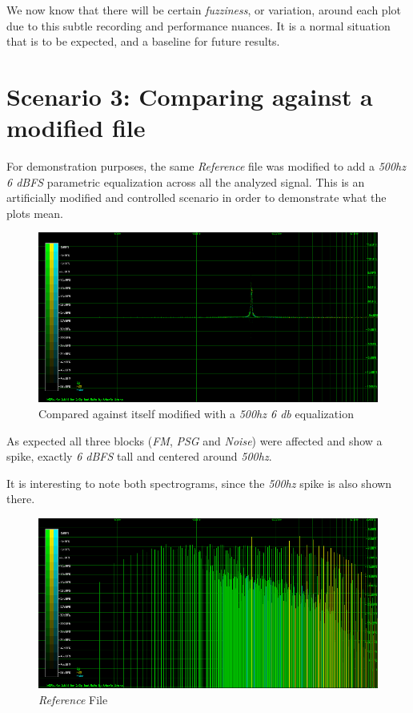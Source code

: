 \documentclass[10pt,a4paper]{report}
\begin{document}
We now know that there will be certain \textit{fuzziness}, or variation, around each plot due to this subtle recording and performance nuances. It is a normal situation that is to be expected, and a baseline for future results.

\section{Scenario 3: Comparing against a modified file}

For demonstration purposes, the same \textit{Reference} file was modified to add a \textit{500hz 6 dBFS} parametric equalization across all the analyzed signal. This is an artificially modified and controlled scenario in order to demonstrate what the plots mean.

\begin{figure}[H]
	\centering
	\includegraphics[width=1.0\linewidth]{images/interpretation/Plot3-Modified.png}
	\caption[1kHz modified]{Compared against itself modified with a \textit{500hz 6 db} equalization}
	\label{fig:plot3-modified}
\end{figure}

As expected all three blocks (\textit{FM}, \textit{PSG} and \textit{Noise}) were affected and show a spike, exactly \textit{6 dBFS} tall and centered around \textit{500hz}.

It is interesting to note both spectrograms, since the \textit{500hz} spike is also shown there.

\begin{figure}[H]
	\centering
	\includegraphics[width=1.0\linewidth]{images/interpretation/Plot3-Spectrogram.png}
	\caption[Reference File]{\textit{Reference} File}
	\label{fig:plot3-spectrogram}
\end{figure}
\end{document}
